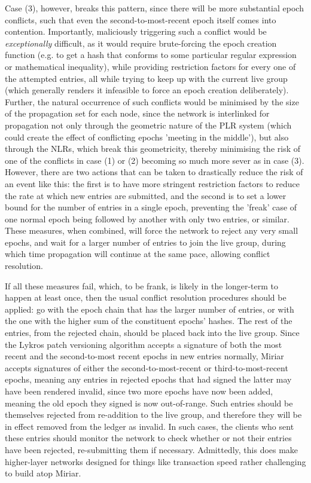 \documentclass{extreport}
\begin{document}
Case (3), however, breaks this pattern, since there will be more substantial epoch conflicts, such that even the second-to-most-recent epoch itself comes into contention. Importantly, maliciously triggering such a conflict would be \emph{exceptionally} difficult, as it would require brute-forcing the epoch creation function (e.g. to get a hash that conforms to some particular regular expression or mathematical inequality), while providing restriction factors for every one of the attempted entries, all while trying to keep up with the current live group (which generally renders it infeasible to force an epoch creation deliberately). Further, the natural occurrence of such conflicts would be minimised by the size of the propagation set for each node, since the network is interlinked for propagation not only through the geometric nature of the PLR system (which could create the effect of conflicting epochs 'meeting in the middle'), but also through the NLRs, which break this geometricity, thereby minimising the risk of one of the conflicts in case (1) or (2) becoming so much more sever as in case (3). However, there are two actions that can be taken to drastically reduce the risk of an event like this: the first is to have more stringent restriction factors to reduce the rate at which new entries are submitted, and the second is to set a lower bound for the number of entries in a single epoch, preventing the 'freak' case of one normal epoch being followed by another with only two entries, or similar. These measures, when combined, will force the network to reject any very small epochs, and wait for a larger number of entries to join the live group, during which time propagation will continue at the same pace, allowing conflict resolution.

If all these measures fail, which, to be frank, is likely in the longer-term to happen at least once, then the usual conflict resolution procedures should be applied: go with the epoch chain that has the larger number of entries, or with the one with the higher sum of the constituent epochs' hashes. The rest of the entries, from the rejected chain, should be placed back into the live group. Since the Lykros patch versioning algorithm accepts a signature of both the most recent and the second-to-most recent epochs in new entries normally, Miriar accepts signatures of either the second-to-most-recent or third-to-most-recent epochs, meaning any entries in rejected epochs that had signed the latter may have been rendered invalid, since two more epochs have now been added, meaning the old epoch they signed is now out-of-range. Such entries should be themselves rejected from re-addition to the live group, and therefore they will be in effect removed from the ledger as invalid. In such cases, the clients who sent these entries should monitor the network to check whether or not their entries have been rejected, re-submitting them if necessary. Admittedly, this does make higher-layer networks designed for things like transaction speed rather challenging to build atop Miriar.
\end{document}
